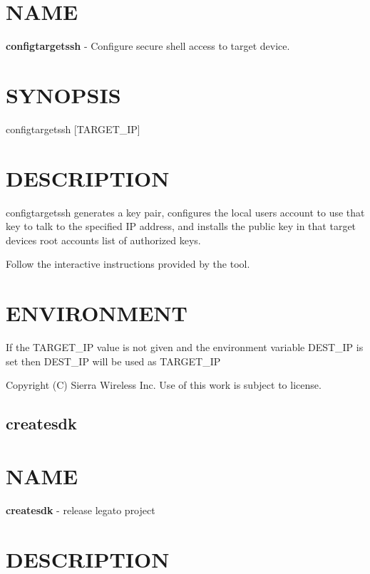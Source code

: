 \section*{N\+A\+M\+E}

{\bfseries configtargetssh} -\/ Configure secure shell access to target device.

\section*{S\+Y\+N\+O\+P\+S\+I\+S}

{\ttfamily configtargetssh \mbox{[}T\+A\+R\+G\+E\+T\+\_\+\+I\+P\mbox{]}}~\newline


\section*{D\+E\+S\+C\+R\+I\+P\+T\+I\+O\+N}

configtargetssh generates a key pair, configures the local user\textquotesingle{}s account to use that key to talk to the specified I\+P address, and installs the public key in that target device\textquotesingle{}s root account\textquotesingle{}s list of authorized keys.

Follow the interactive instructions provided by the tool.

\section*{E\+N\+V\+I\+R\+O\+N\+M\+E\+N\+T}

\begin{DoxyVerb}If the TARGET_IP value is not given and the environment variable DEST_IP
is set then DEST_IP will be used as TARGET_IP
\end{DoxyVerb}




 Copyright (C) Sierra Wireless Inc. Use of this work is subject to license. \hypertarget{toolsHost_createsdk}{}\subsection{createsdk}\label{toolsHost_createsdk}
\section*{N\+A\+M\+E}

{\bfseries createsdk} -\/ release legato project

\section*{D\+E\+S\+C\+R\+I\+P\+T\+I\+O\+N}

